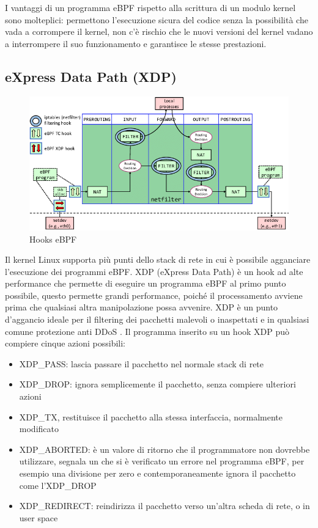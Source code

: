 I vantaggi di un programma eBPF rispetto alla scrittura di un modulo kernel sono molteplici: permettono l'esecuzione sicura del codice senza la possibilità che vada a corrompere il kernel, non c'è rischio che le nuovi versioni del kernel vadano a interrompere il suo funzionamento e garantisce le stesse prestazioni.


\subsection{eXpress Data Path (XDP)}
\begin{figure}[]
    \label{fig:hooks}
    \includegraphics[width=\hsize]{images/mitigazione/hooks.png}
    \caption{Hooks eBPF}
    \centering
\end{figure}
Il kernel Linux supporta più punti dello stack di rete in cui è possibile agganciare l'esecuzione dei programmi eBPF.
XDP (eXpress Data Path) è un hook ad alte performance che permette di eseguire un programma eBPF al primo punto possibile, questo permette grandi performance, poiché il processamento avviene prima che qualsiasi altra manipolazione possa avvenire. XDP è un punto d'aggancio ideale per il filtering dei pacchetti malevoli o inaspettati e in qualsiasi comune protezione anti DDoS \cite{cilium_xdp}.
Il programma inserito su un hook XDP può compiere cinque azioni possibili:
\begin{itemize}
    \item XDP\_PASS: lascia passare il pacchetto nel normale stack di rete
    \item XDP\_DROP: ignora semplicemente il pacchetto, senza compiere ulteriori azioni
    \item XDP\_TX, restituisce il pacchetto alla stessa interfaccia, normalmente modificato
    \item XDP\_ABORTED: è un valore di ritorno che il programmatore non dovrebbe utilizzare, segnala un che si è verificato un errore nel programma eBPF, per esempio una divisione per zero e contemporaneamente ignora il pacchetto come l'XDP\_DROP
    \item XDP\_REDIRECT: reindirizza il pacchetto verso un'altra scheda di rete, o in user space
\end{itemize}


